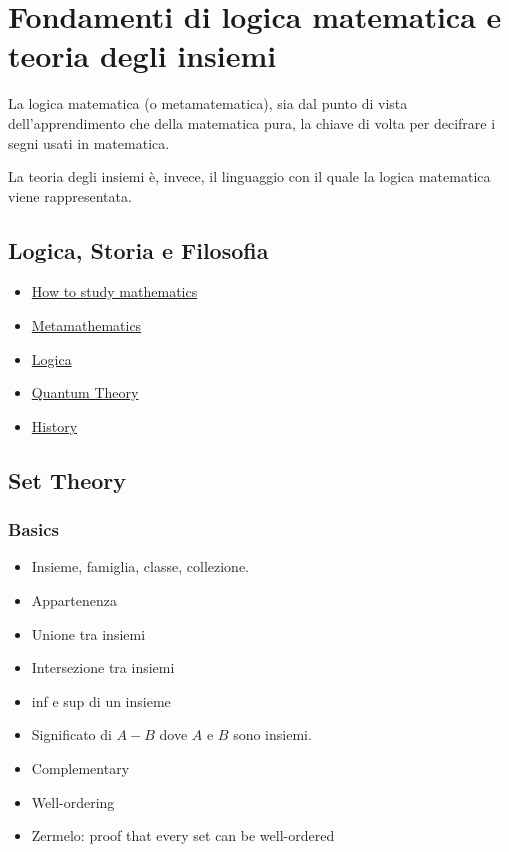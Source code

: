 \chapter{Fondamenti di logica matematica e teoria degli insiemi}
La logica matematica (o metamatematica), sia dal punto di vista dell'apprendimento che della matematica pura, la chiave di volta per decifrare i segni usati in matematica.

La teoria degli insiemi \`e, invece, il linguaggio con il quale la logica matematica viene rappresentata.

\section{Logica, Storia e Filosofia}
\begin{itemize}
 \item \href{HowToStudy.pdf}{How to study mathematics}
  \item \href{Metamathematics.pdf}{Metamathematics}
  \item \href{Logics.pdf}{Logica}
  \item \href{QuantumTheory.pdf}{Quantum Theory}
  \item \href{history.pdf}{History} 
\end{itemize}

\section{Set Theory}
\subsection*{Basics}
\begin{itemize}
 \item Insieme, famiglia, classe, collezione.
 \item Appartenenza
 \item Unione tra insiemi
 \item Intersezione tra insiemi 
 \item inf e sup di un insieme
 \item Significato di $A - B$ dove $A$ e $B$ sono insiemi.
 \item Complementary
 \item Well-ordering
 \item Zermelo: proof that every set can be well-ordered
\end{itemize}
 
